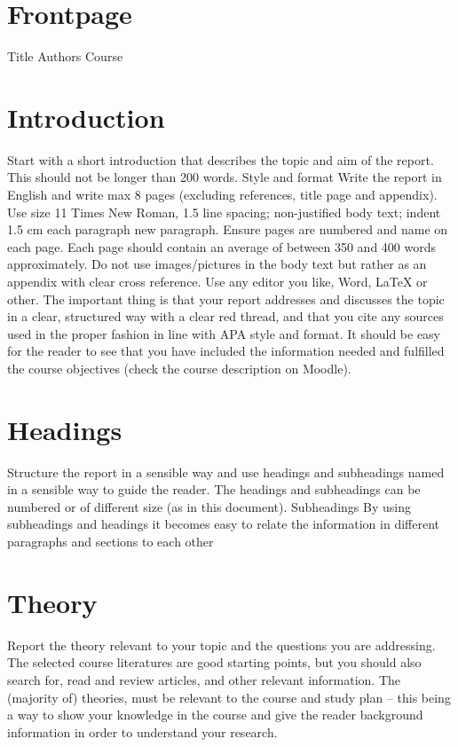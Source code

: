 \section{Frontpage}
Title
Authors
Course


\section{Introduction}
Start with a short introduction that describes the topic and aim of the report. This should not be longer than 200 words.
Style and format
Write the report in English and write max 8 pages (excluding references, title page and appendix). Use size 11 Times New Roman, 1.5 line spacing; non-justified body text; indent 1.5 cm each paragraph new paragraph. Ensure pages are numbered and name on each page. Each page should contain an average of between 350 and 400 words approximately. Do not use images/pictures in the body text but rather as an appendix with clear cross reference.
Use any editor you like, Word, LaTeX or other. The important thing is that your report addresses and discusses the topic in a clear, structured way with a clear red thread, and that you cite any sources used in the proper fashion in line with APA style and format. It should be easy for the reader to see that you have included the information needed and fulfilled the course objectives (check the course description on Moodle).
\section{Headings}
Structure the report in a sensible way and use headings and subheadings named in a sensible way to guide the reader. The headings and subheadings can be numbered or of different size (as in this document).
Subheadings
By using subheadings and headings it becomes easy to relate the information in different paragraphs and sections to each other
\section{Theory}
Report the theory relevant to your topic and the questions you are addressing. The selected course literatures are good starting points, but you should also search for, read and review articles, and other relevant information. The (majority of) theories, must be relevant to the course and study plan – this being a way to show your knowledge in the course and give the reader background information in order to understand your research.

